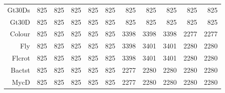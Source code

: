 \begin{table}[p]
\begin{tabular}{rrrrrrrrrrr}
  Gt30Ds & 825 & 825 & 825 & 825 & 825 & 825 & 825 & 825 & 825 & 825 \\ 
  Gt30D & 825 & 825 & 825 & 825 & 825 & 825 & 825 & 825 & 825 & 825 \\ 
  Colour & 825 & 825 & 825 & 825 & 825 & 3398 & 3398 & 3398 & 2277 & 2277 \\ 
  Fly & 825 & 825 & 825 & 825 & 825 & 3398 & 3401 & 3401 & 2280 & 2280 \\ 
  Flcrot & 825 & 825 & 825 & 825 & 825 & 3398 & 3401 & 3401 & 2280 & 2280 \\ 
  Bactst & 825 & 825 & 825 & 825 & 825 & 2277 & 2280 & 2280 & 2280 & 2280 \\ 
  MycD & 825 & 825 & 825 & 825 & 825 & 2277 & 2280 & 2280 & 2280 & 2280 \\ 
   \hline
\end{tabular}
\normalsize
\end{table}

